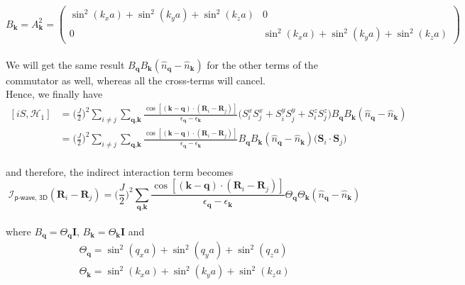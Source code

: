 \documentclass{article}
\begin{document}
\begin{equation}
B_\textbf{k} = A_\textbf{k}^2 = \begin{pmatrix}\sin^2(k_xa) + \sin^2(k_ya) + \sin^2(k_za) & 0 \\ 0 & \sin^2(k_xa) + \sin^2(k_ya) + \sin^2(k_za) \end{pmatrix}
\end{equation}
\\
We will get the same result  $B_\textbf{q}B_\textbf{k}(\hat{n}_\textbf{q} - \hat{n}_\textbf{k})$ for the other terms of the commutator as well, whereas all the cross-terms will cancel.
\\
Hence, we finally have
\\
\begin{equation}
\begin{split}
[iS, \mathcal{H}_1] &= \Bigg(\frac{J}{2}\Bigg)^2 \sum_{i \neq j} \sum_{\textbf{q}, \textbf{k}} \frac{\cos[(\textbf{k} - \textbf{q}) \cdot ( \textbf{R}_i - \textbf{R}_j)]}{\epsilon_{\textbf{q}} - \epsilon_{\textbf{k}}}   \Big(S_i^xS_j^x + S_i^yS_j^y + S_i^zS_j^z\Big) B_\textbf{q}B_\textbf{k}(\hat{n}_\textbf{q} - \hat{n}_\textbf{k}) \\
&= \Bigg(\frac{J}{2}\Bigg)^2 \sum_{i \neq j} \sum_{\textbf{q}, \textbf{k}} \frac{\cos[(\textbf{k} - \textbf{q}) \cdot ( \textbf{R}_i - \textbf{R}_j)]}{\epsilon_{\textbf{q}} - \epsilon_{\textbf{k}}}    B_\textbf{q}B_\textbf{k}(\hat{n}_\textbf{q} - \hat{n}_\textbf{k}) \Big(\textbf{S}_i\cdot \textbf{S}_j\Big)
\end{split}
\end{equation}
\\
and therefore, the indirect interaction term becomes
\\
\begin{equation}
\mathcal{I}_\textsf{p-wave, 3D} (\textbf{R}_i - \textbf{R}_j) = \Bigg(\frac{J}{2}\Bigg)^2 \sum_{\textbf{q}, \textbf{k}}\frac{\cos[(\textbf{k} - \textbf{q}) \cdot ( \textbf{R}_i - \textbf{R}_j)]}{\epsilon_{\textbf{q}} - \epsilon_{\textbf{k}}}    \Theta_\textbf{q}\Theta_\textbf{k}(\hat{n}_\textbf{q} - \hat{n}_\textbf{k}) 
\end{equation}
\\
where $B_\textbf{q} = \Theta_\textbf{q} \textbf{I}$, $B_\textbf{k} = \Theta_\textbf{k} \textbf{I}$ and
\\
\begin{equation}
\begin{split}
\Theta_\textbf{q} = \sin^2(q_xa) + \sin^2(q_ya) + \sin^2(q_za)\\
\Theta_\textbf{k} = \sin^2(k_xa) + \sin^2(k_ya) + \sin^2(k_za)
\end{split}
\end{equation}
\end{document}
